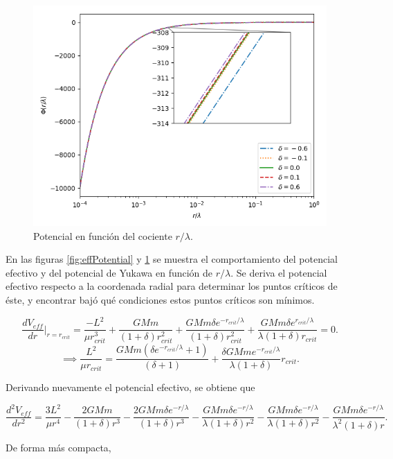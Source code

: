 \documentclass{article}
\begin{document}
\begin{figure}
	\centering
	\includegraphics[width=.7\textwidth]{../potential.png}
	\caption{Potencial  en función del cociente $r/\lambda$.}
	\label{fig:potential}
\end{figure}

En las figuras \ref{fig:effPotential} y \ref{fig:potential} se muestra el comportamiento del potencial efectivo y del potencial de Yukawa en función de $r/\lambda$. Se deriva el potencial efectivo respecto a la coordenada radial para determinar los puntos críticos de éste, y encontrar bajó qué condiciones estos puntos críticos son mínimos.

\begin{dmath*}
	\frac{dV_{eff}}{dr}\Big|_{r=r_{crit}}=\frac{-L^2}{\mu r_{crit}^3}+\frac{GMm}{(1+\delta)r_{crit}^2}+\frac{GMm\delta e^{-r_{crit}/\lambda}}{(1+\delta)r_{crit}^2}+\frac{GMm\delta e^{r_{crit}/\lambda}}{\lambda(1+\delta)r_{crit}}=0.
\end{dmath*}
\begin{equation}\label{criticalCondition}
	\implies \frac{L^2}{\mu r_{crit}}=\frac{GMm(\delta e^{-r_{crit}/\lambda}+1)}{(\delta+1)}+\frac{\delta GMme^{-r_{crit}/\lambda}}{\lambda(1+\delta)}r_{crit}.
\end{equation}

Derivando nuevamente el potencial efectivo, se obtiene que

\begin{equation*}
	\frac{d^2V_{eff}}{dr^2}=\frac{3L^2}{\mu r^4}-\frac{2GMm}{(1+\delta)r^3}-\frac{2GMm\delta e^{-r/\lambda}}{(1+\delta)r^3}-\frac{GMm\delta e^{-r/\lambda}}{\lambda(1+\delta)r^2}-\frac{GMm\delta e^{-r/\lambda}}{\lambda(1+\delta)r^2}-\frac{GMm\delta e^{-r/\lambda}}{\lambda^2(1+\delta)r}.
\end{equation*}

De forma más compacta,
\end{document}
